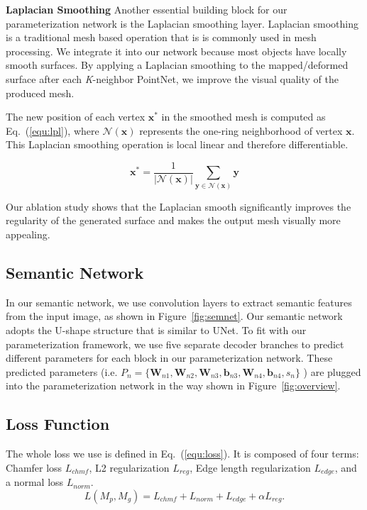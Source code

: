 \noindent\textbf{Laplacian Smoothing}
Another essential building block for our parameterization network is the Laplacian smoothing layer. Laplacian smoothing is a traditional mesh based operation that is is commonly used in mesh processing. We integrate it into our network because most objects have locally smooth surfaces. By applying a Laplacian smoothing to the mapped/deformed surface after each \textit{K}-neighbor PointNet, we improve the visual quality of the produced mesh.

The new position of each vertex $\mathbf{x}^{*}$ in the smoothed mesh is computed as Eq.~(\ref{equ:lpl}), where $\mathcal{N}(\mathbf{x})$ represents the one-ring neighborhood of vertex $\mathbf{x}$. 
This Laplacian smoothing operation is local linear and therefore differentiable.

\begin{equation}
\mathbf{x}^* = \frac{1}{|\mathcal{N}(\mathbf{x})|}\sum_{\mathbf{y}\in\mathcal{N}(\mathbf{x})}\mathbf{y}
\label{equ:lpl}
\end{equation}

Our ablation study shows that the Laplacian smooth significantly improves the regularity of the generated surface and makes the output mesh visually more appealing.

\subsection{Semantic Network}
\label{subsec:semnet}
%
In our semantic network, we use convolution layers to extract semantic features from the input image, as shown in Figure~\ref{fig:semnet}.  
Our semantic network adopts the U-shape structure that is similar to UNet\cite{unet}. 
To fit with our parameterization framework, we use five separate decoder branches to predict different parameters for each block in our parameterization network. These predicted parameters (i.e. $P_n=\{\mathbf{W}_{n1},\mathbf{W}_{n2},\mathbf{W}_{n3},\mathbf{b}_{n3},\mathbf{W}_{n4},\mathbf{b}_{n4},s_{n}\}$ ) are plugged into the parameterization network in the way shown in Figure~\ref{fig:overview}.

\subsection{Loss Function}

The whole loss we use is defined in Eq.~(\ref{equ:loss}).
It is composed of four terms: Chamfer loss $L_{chmf}$, L2 regularization $L_{reg}$, Edge length regularization $L_{edge}$, and a normal loss $L_{norm}$.
\begin{equation}
\label{equ:loss}
L(M_p, M_g ) = L_{chmf} + L_{norm} + L_{edge}+ \alpha L_{reg}.
\end{equation}

